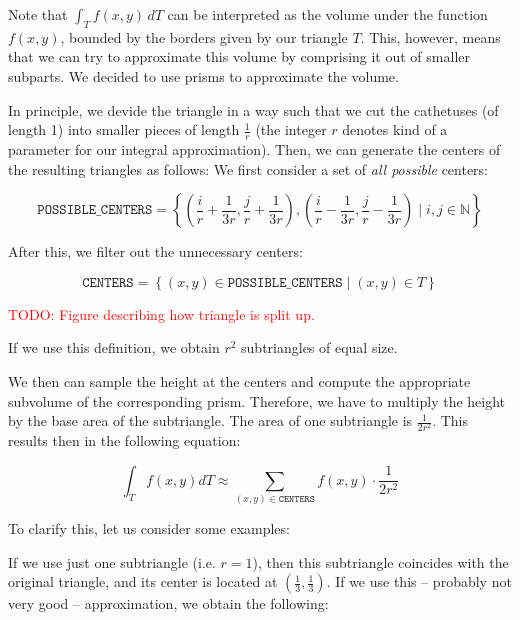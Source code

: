 \documentclass{article}
\newcommand{\todo}[1]{\textcolor{red}{TODO: #1}}
\begin{document}
Note that $\int_T f(x,y)\,dT$ can be interpreted as the volume under the function $f(x,y)$, bounded by the borders given by our triangle $T$. This, however, means that we can try to approximate this volume by comprising it out of smaller subparts. We decided to use prisms to approximate the volume.

In principle, we devide the triangle in a way such that we cut the cathetuses (of length 1) into smaller pieces of length $\frac{1}{r}$ (the integer $r$ denotes kind of a parameter for our integral approximation). Then, we can generate the centers of the resulting triangles as follows: We first consider a set of \emph{all possible} centers:

\begin{equation*}
  \mathtt{POSSIBLE\_CENTERS} = \left\{ 
    \left(\frac{i}{r} + \frac{1}{3r}, \frac{j}{r} + \frac{1}{3r}\right) ,
    \left(\frac{i}{r} - \frac{1}{3r}, \frac{j}{r} - \frac{1}{3r}\right) 
    \mid
    i, j\in \mathbb{N}
  \right\}
\end{equation*}

After this, we filter out the unnecessary centers:

\begin{equation*}
  \mathtt{CENTERS} = \left\{ 
    (x,y)\in \mathtt{POSSIBLE\_CENTERS} 
    \mid 
    (x,y) \in T
  \right\}
\end{equation*}

\todo{Figure describing how triangle is split up.}

If we use this definition, we obtain $r^2$ subtriangles of equal size.

We then can sample the height at the centers and compute the appropriate subvolume of the corresponding prism. Therefore, we have to multiply the height by the base area of the subtriangle. The area of one subtriangle is $\frac{1}{2 r^2}$. This results then in the following equation:

\begin{equation}
  \int_T f(x,y) dT \approx \sum_{(x,y)\in\mathtt{CENTERS}} f(x,y) \cdot \frac{1}{2r^2}
\end{equation}

To clarify this, let us consider some examples:

If we use just one subtriangle (i.e. $r=1$), then this subtriangle coincides with the original triangle, and its center is located at $(\frac{1}{3}, \frac{1}{3})$. If we use this -- probably not very good -- approximation, we obtain the following:
\end{document}
